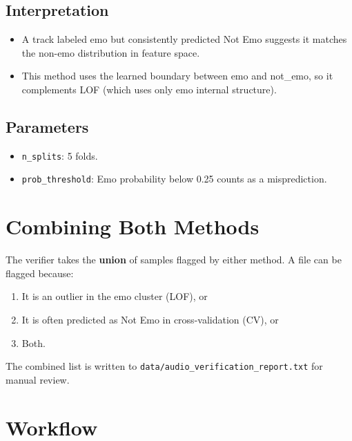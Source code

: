 \documentclass[11pt,a4paper]{article}
\begin{document}
\subsection{Interpretation}

\begin{itemize}
  \item A track labeled emo but consistently predicted Not Emo suggests it matches the non-emo distribution in feature space.
  \item This method uses the learned boundary between emo and not\_emo, so it complements LOF (which uses only emo internal structure).
\end{itemize}

\subsection{Parameters}

\begin{itemize}
  \item \texttt{n\_splits}: 5 folds.
  \item \texttt{prob\_threshold}: Emo probability below 0.25 counts as a misprediction.
\end{itemize}

\section{Combining Both Methods}

The verifier takes the \textbf{union} of samples flagged by either method. A file can be flagged because:

\begin{enumerate}
  \item It is an outlier in the emo cluster (LOF), or
  \item It is often predicted as Not Emo in cross-validation (CV), or
  \item Both.
\end{enumerate}

The combined list is written to \texttt{data/audio\_verification\_report.txt} for manual review.

\section{Workflow}
\end{document}
